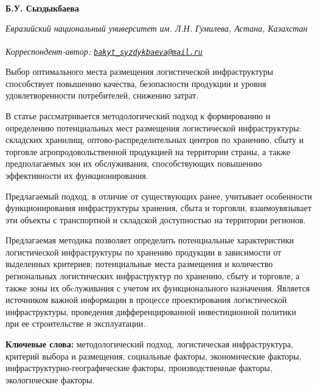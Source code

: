 
\begin{articleheader}

{\bfseries
Б.У. Сыздыкбаева\textsuperscript{\envelope } \authorid}
\end{articleheader}

\begin{affiliation}
\emph{Евразийский национальный университет им. Л.Н. Гумилева, Астана, Казахстан}

\raggedright \textsuperscript{\envelope }{\em Корреспондент-автор: \href{mailto:bakyt_syzdykbaeva@mail.ru}{\nolinkurl{bakyt\_syzdykbaeva@mail.ru}}}
\end{affiliation}

Выбор оптимального места размещения логистической инфраструктуры
способствует повышению качества, безопасности продукции и уровня
удовлетворенности потребителей, снижению затрат.

В статье рассматривается методологический подход к формированию и
определению потенциальных мест размещения логистической инфраструктуры:
складских хранилищ, оптово-распределительных центров по хранению, сбыту
и торговле агропродовольственной продукцией на территории страны, а
также предполагаемых зон их обслуживания, способствующих повышению
эффективности их функционирования.

Предлагаемый подход, в отличие от существующих ранее, учитывает
особенности функционирования инфраструктуры хранения, сбыта и торговли,
взаимоувязывает эти объекты с транспортной и складской доступностью на
территории регионов.

Предлагаемая методика позволяет определить потенциальные характеристики
логистической инфраструктуры по хранению продукции в зависимости от
выделенных критериев; потенциальные места размещения и количество
региональных логистических инфраструктур по хранению, сбыту и торговле,
а также зоны их обcлуживания с учетом их функционального назначения.
Является источником важной информации в процессе проектирования
логистической инфраструктуры, проведения дифференцированной
инвестиционной политики при ее строительстве и эксплуатации.

{\bfseries Ключевые слова:} методологический подход, логистическая
инфраструктура, критерий выбора и размещения, социальные факторы,
экономические факторы, инфраструктурно-географические факторы,
производственные факторы, экологические факторы.


